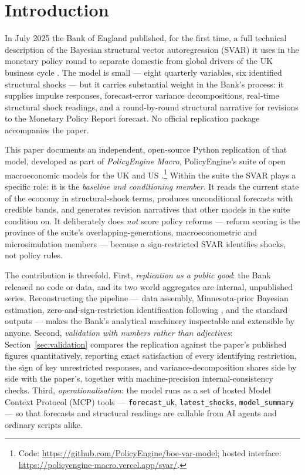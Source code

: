 \section{Introduction}
\label{sec:intro}

In July 2025 the Bank of England published, for the first time, a full technical description of the Bayesian structural vector autoregression (SVAR) it uses in the monetary policy round to separate domestic from global drivers of the UK business cycle \citep{brignone2025}. The model is small --- eight quarterly variables, six identified structural shocks --- but it carries substantial weight in the Bank's process: it supplies impulse responses, forecast-error variance decompositions, real-time structural shock readings, and a round-by-round structural narrative for revisions to the Monetary Policy Report forecast. No official replication package accompanies the paper.

This paper documents an independent, open-source Python replication of that model, developed as part of \emph{PolicyEngine Macro}, PolicyEngine's suite of open macroeconomic models for the UK and US \citep{policyengine}.\footnote{Code: \url{https://github.com/PolicyEngine/boe-var-model}; hosted interface: \url{https://policyengine-macro.vercel.app/svar/}.} Within the suite the SVAR plays a specific role: it is the \emph{baseline and conditioning member}. It reads the current state of the economy in structural-shock terms, produces unconditional forecasts with credible bands, and generates revision narratives that other models in the suite condition on. It deliberately does \emph{not} score policy reforms --- reform scoring is the province of the suite's overlapping-generations, macroeconometric and microsimulation members --- because a sign-restricted SVAR identifies shocks, not policy rules.

The contribution is threefold. First, \emph{replication as a public good}: the Bank released no code or data, and its two world aggregates are internal, unpublished series. Reconstructing the pipeline --- data assembly, Minnesota-prior Bayesian estimation, zero-and-sign-restriction identification following \citet{arias2018}, and the standard outputs --- makes the Bank's analytical machinery inspectable and extensible by anyone. Second, \emph{validation with numbers rather than adjectives}: Section~\ref{sec:validation} compares the replication against the paper's published figures quantitatively, reporting exact satisfaction of every identifying restriction, the sign of key unrestricted responses, and variance-decomposition shares side by side with the paper's, together with machine-precision internal-consistency checks. Third, \emph{operationalisation}: the model runs as a set of hosted Model Context Protocol (MCP) tools --- \texttt{forecast\_uk}, \texttt{latest\_shocks}, \texttt{model\_summary} --- so that forecasts and structural readings are callable from AI agents and ordinary scripts alike.

